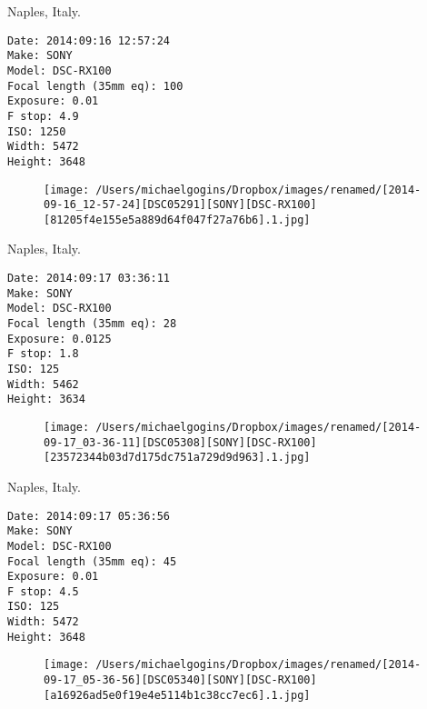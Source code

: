 \documentclass[11pt,letter,DIV=14,paper=landscape]{scrbook}
\begin{document}
\clearpage
\noindent Naples, Italy.
\noindent
\begin{lstlisting}
Date: 2014:09:16 12:57:24
Make: SONY
Model: DSC-RX100
Focal length (35mm eq): 100
Exposure: 0.01
F stop: 4.9
ISO: 1250
Width: 5472
Height: 3648
\end{lstlisting}
\clearpage

\begin{figure}
\texttt{[image: /Users/michaelgogins/Dropbox/images/renamed/[2014-09-16\_12-57-24][DSC05291][SONY][DSC-RX100][81205f4e155e5a889d64f047f27a76b6].1.jpg]}
\end{figure}
    
\clearpage
\noindent Naples, Italy.
\noindent
\begin{lstlisting}
Date: 2014:09:17 03:36:11
Make: SONY
Model: DSC-RX100
Focal length (35mm eq): 28
Exposure: 0.0125
F stop: 1.8
ISO: 125
Width: 5462
Height: 3634
\end{lstlisting}
\clearpage

\begin{figure}
\texttt{[image: /Users/michaelgogins/Dropbox/images/renamed/[2014-09-17\_03-36-11][DSC05308][SONY][DSC-RX100][23572344b03d7d175dc751a729d9d963].1.jpg]}
\end{figure}
    
\clearpage
\noindent Naples, Italy.
\noindent
\begin{lstlisting}
Date: 2014:09:17 05:36:56
Make: SONY
Model: DSC-RX100
Focal length (35mm eq): 45
Exposure: 0.01
F stop: 4.5
ISO: 125
Width: 5472
Height: 3648
\end{lstlisting}
\clearpage

\begin{figure}
\texttt{[image: /Users/michaelgogins/Dropbox/images/renamed/[2014-09-17\_05-36-56][DSC05340][SONY][DSC-RX100][a16926ad5e0f19e4e5114b1c38cc7ec6].1.jpg]}
\end{figure}
    
\end{document}
